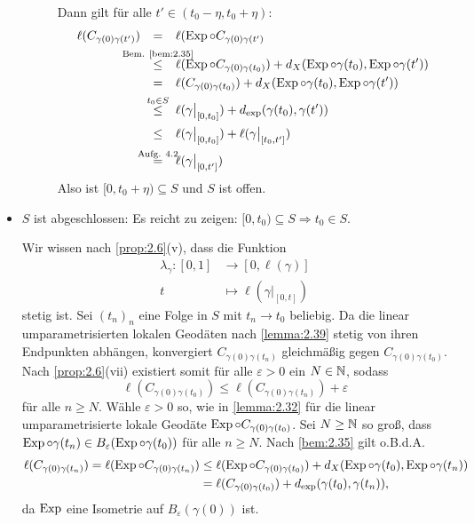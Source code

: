 \begin{beweis}
\begin{itemize}
\begin{description}
			Dann gilt für alle $t' \in (t_0 - \eta, t_0 + \eta)$:
			\begin{align*}
				\ell(C_{\gamma(0)\gamma(t')}) &\stack{}{=} \ell(\Exp \circ C_{\gamma(0)\gamma(t')} \\
				&\stack{\text{Bem. \ref{bem:2.35}}}{\leq} \ell(\Exp \circ C_{\gamma(0)\gamma(t_0)}) + d_X(\Exp \circ \gamma(t_0),\Exp \circ \gamma(t')) \\
				&\stack{}{=} \ell(C_{\gamma(0)\gamma(t_0)}) + d_X(\Exp \circ \gamma(t_0),\Exp \circ \gamma(t')) \\
				&\stack{t_0 \in S}{\leq} \ell(\gamma \big|_{[0,t_0]}) + d_{\exp}(\gamma(t_0),\gamma(t')) \\
				&\stack{}{\leq} \ell(\gamma \big|_{[0,t_0]}) + \ell(\gamma \big|_{[t_0,t']}) \\
				&\stack{\text{Aufg. 4.2}}{=} \ell(\gamma \big|_{[0,t']})
			\end{align*}
			Also ist $[0,t_0 + \eta) \subseteq S$ und $S$ ist offen.
		\end{description}
		\item $S$ ist abgeschlossen:
		Es reicht zu zeigen: $[0,t_0) \subseteq S \Rightarrow t_0 \in S$.
		
		Wir wissen nach \autoref{prop:2.6}(v), dass die Funktion
		\begin{align}
			\lambda_\gamma\colon [0,1] &\longrightarrow [0,\ell(\gamma)] \label{eq:2.40.1}\\
			t &\longmapsto \ell(\gamma \big|_{[0,t]})
		\end{align}
		stetig ist.
		Sei $(t_n)_n$ eine Folge in $S$ mit $t_n \rightarrow t_0$ beliebig.
		Da die linear umparametrisierten lokalen Geodäten nach \autoref{lemma:2.39} stetig von ihren Endpunkten abhängen, konvergiert $C_{\gamma(0)\gamma(t_n)}$ gleichmäßig gegen $C_{\gamma(0)\gamma(t_0)}$.
		Nach \autoref{prop:2.6}(vii) existiert somit für alle $\varepsilon > 0$ ein $N \in \mathbb{N}$, sodass
		\begin{equation}
			\ell(C_{\gamma(0)\gamma(t_0)}) \leq \ell(C_{\gamma(0)\gamma(t_n)}) + \varepsilon \label{eq:2.40.2}
		\end{equation}
		für alle $n \geq N$.
		Wähle $\varepsilon > 0$ so, wie in \autoref{lemma:2.32} für die linear umparametrisierte lokale Geodäte $\operatorname{Exp} \circ C_{\gamma(0)\gamma(t_0)}$.
		Sei $N \geq \mathbb{N}$ so groß, dass $\operatorname{Exp} \circ \gamma(t_n) \in B_\varepsilon(\operatorname{Exp} \circ \gamma(t_0))$ für alle $n \geq N$.
		Nach \autoref{bem:2.35} gilt o.B.d.A.
		\begin{align}
			\ell(C_{\gamma(0)\gamma(t_n)}) = \ell(\operatorname{Exp} \circ C_{\gamma(0)\gamma(t_n)}) &\leq \ell(\operatorname{Exp} \circ C_{\gamma(0)\gamma(t_0)}) + d_X(\operatorname{Exp} \circ \gamma(t_0),\operatorname{Exp} \circ \gamma(t_n)) \\
			&= \ell(C_{\gamma(0)\gamma(t_0)}) + d_{\exp}(\gamma(t_0),\gamma(t_n)), \label{eq:2.40.3}
		\end{align}
		da $\operatorname{Exp}$ eine Isometrie auf $B_\varepsilon(\gamma(0))$ ist.
		

\end{itemize}
\end{beweis}
